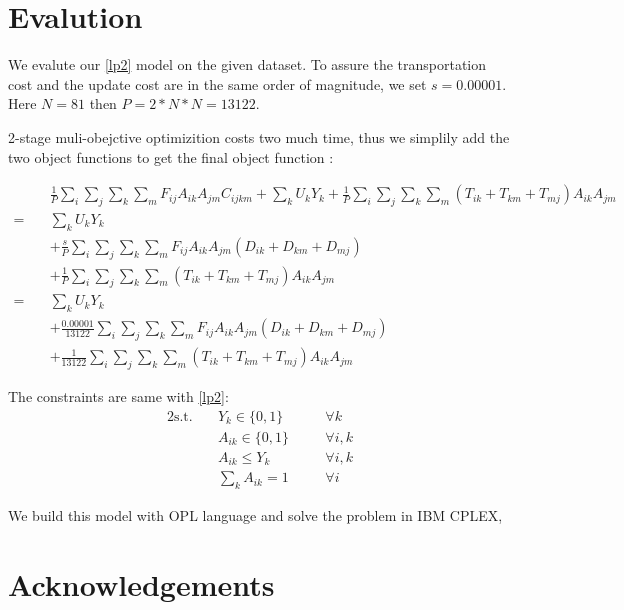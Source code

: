 \documentclass{llncs}
\begin{document}
\section{Evalution}
We evalute our \ref{lp2} model on the given dataset.
To assure the transportation cost and the update cost are in the same order of magnitude, we set $s=0.00001$. Here $N=81$ then $P = 2*N*N = 13122$. 

2-stage muli-obejctive optimizition costs two much time, thus we simplily add the two object functions to get the final object function :

\begin{align}
	 \quad & \frac{1}{P} \sum_{i}\sum_{j}\sum_{k}\sum_{m}F_{ij}  A_{ik} A_{jm} C_{ijkm} + \sum_{k}U_k Y_{k} 
	 + \frac{1}{P} \sum_{i}\sum_{j}\sum_{k}\sum_{m}{(T_{ik}+ T_{km}+ T_{mj} ) A_{ik} A_{jm}} \nonumber \\
	 = \quad &   \sum_{k}U_k Y_{k} \nonumber \\
	 & + \frac{s}{P} \sum_{i}\sum_{j}\sum_{k}\sum_{m}F_{ij}  A_{ik} A_{jm} (D_{ik}+D_{km}+D_{mj}) \nonumber\\
     & + \frac{1}{P} \sum_{i}\sum_{j}\sum_{k}\sum_{m}{(T_{ik}+ T_{km}+ T_{mj} ) A_{ik} A_{jm}}	 \nonumber\\
     = \quad &\sum_{k}U_k Y_{k} \nonumber\\
     & + \frac{0.00001}{13122} \sum_{i}\sum_{j}\sum_{k}\sum_{m}F_{ij}  A_{ik} A_{jm} (D_{ik}+D_{km}+D_{mj})   \nonumber\\
     & + \frac{1}{13122} \sum_{i}\sum_{j}\sum_{k}\sum_{m}{(T_{ik}+ T_{km}+ T_{mj} ) A_{ik} A_{jm}}
\end{align}

The constraints are same with \ref{lp2}:
\begin{alignat}{2}
	\mbox{s.t.}  \quad
	&Y_{k} \in \{0,1\} &\quad& \forall k \label{st1.1}\\ 
	&A_{ik} \in \{0,1\} &\quad& \forall i,k \label{st1.2}\\ 
	&A_{ik} \leq Y_{k} &\quad& \forall i,k \label{st1.3}\\
	&\sum_{k}{A_{ik}} = 1 &\quad& \forall i \label{st1.4}
\end{alignat}

We build this model with OPL language and solve the problem in IBM CPLEX, 


	
	\section*{Acknowledgements}
	
\end{document}
